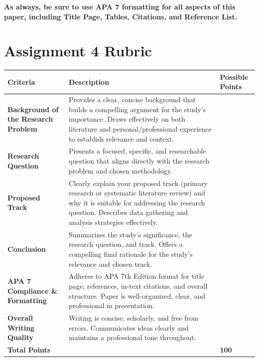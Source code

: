 \documentclass[
  letterpaper,
  DIV=11,
  numbers=noendperiod]{scrreprt}
\begin{document}
\textbf{As always, be sure to use APA 7 formatting for all aspects of
this paper, including Title Page, Tables, Citations, and Reference
List.}

\section{Assignment 4 Rubric}\label{assignment-4-rubric}

\begin{longtable}[]{@{}
  >{\raggedright\arraybackslash}p{}
  >{\raggedright\arraybackslash}p{}
  >{\raggedright\arraybackslash}p{}@{}}
\toprule\noalign{}
\begin{minipage}[b]{\linewidth}\raggedright
\textbf{Criteria}
\end{minipage} & \begin{minipage}[b]{\linewidth}\raggedright
\textbf{Description}
\end{minipage} & \begin{minipage}[b]{\linewidth}\raggedright
\textbf{Possible Points}
\end{minipage} \\
\midrule\noalign{}
\endhead
\bottomrule\noalign{}
\endlastfoot
\textbf{Background of the Research Problem} & Provides a clear, concise
background that builds a compelling argument for the study's importance.
Draws effectively on both literature and personal/professional
experience to establish relevance and context. & 25 \\
\textbf{Research Question} & Presents a focused, specific, and
researchable question that aligns directly with the research problem and
chosen methodology. & 20 \\
\textbf{Proposed Track} & Clearly explain your proposed track (primary
research or systematic literature review) and why it is suitable for
addressing the research question. Describes data gathering and analysis
strategies effectively. & 25 \\
\textbf{Conclusion} & Summarizes the study's significance, the research
question, and track. Offers a compelling final rationale for the study's
relevance and chosen track. & 10 \\
\textbf{APA 7 Compliance \& Formatting} & Adheres to APA 7th Edition
format for title page, references, in-text citations, and overall
structure. Paper is well-organized, clear, and professional in
presentation. & 10 \\
\textbf{Overall Writing Quality} & Writing is concise, scholarly, and
free from errors. Communicates ideas clearly and maintains a
professional tone throughout. & 10 \\
\textbf{Total Points} & & \textbf{100} \\
\end{longtable}
\end{document}
